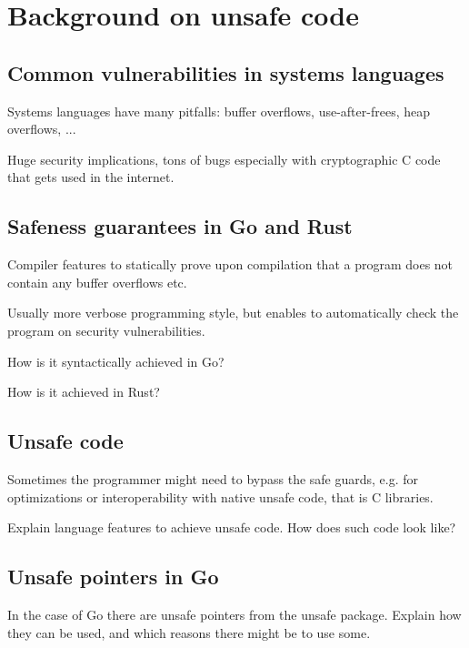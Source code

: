 
\chapter{Background on unsafe code}\label{ch:unsafe-code}



\section{Common vulnerabilities in systems languages}\label{sec:common-vulnerabilities}

Systems languages have many pitfalls: buffer overflows, use-after-frees, heap overflows,
...

Huge security implications, tons of bugs especially with cryptographic C code that gets
used in the internet.



\section{Safeness guarantees in Go and Rust}\label{sec:safeness-feature}

Compiler features to statically prove upon compilation that a program does not contain any
buffer overflows etc.

Usually more verbose programming style, but enables to automatically check the program
on security vulnerabilities.

How is it syntactically achieved in Go?

How is it achieved in Rust?



\section{Unsafe code}\label{sec:unsafe-code}

Sometimes the programmer might need to bypass the safe guards, e.g. for optimizations or
interoperability with native unsafe code, that is C libraries.

Explain language features to achieve unsafe code. How does such code look like?



\section{Unsafe pointers in Go}\label{sec:unsafe-pointers}

In the case of Go there are unsafe pointers from the unsafe package. Explain how they
can be used, and which reasons there might be to use some.
